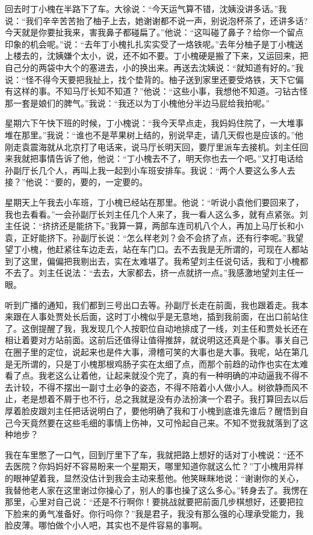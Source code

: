 \documentclass[12pt,oneside]{book}
\begin{document}
回去时丁小槐在半路下了车。大徐说：``今天运气算不错，沈姨没讲多话。''我说：``我们辛辛苦苦抬了柚子上去，她谢谢都不说一声，别说泡杯茶了，还讲多话?今天就是你要扯我来，害我鼻子都碰扁了。''他说：``这叫碰了鼻子？给你一个留点印象的机会呢。''说：``去年丁小槐扎扎实实受了一烙铁呢。''去年分柚子是丁小槐送上楼去的，沈姨嫌个太小，说，还不如不要。丁小槐硬是搬了下来，又运回来，把自己分的两袋中大个的塞进去，小的换出来。再送去沈姨说：``就知道有好的。''我说：``怪不得今天要把我扯上，找个垫背的。柚子送到家里还要受烙铁，天下它偏有这样的事。不知马厅长知不知道？''他说：``这些小事，我想他不知道。刁钻古怪那一套是娘们的脾气。''我说：``我还以为丁小槐他分半边马屁给我拍呢。''

星期六下午快下班的时候，丁小槐说：``我今天早点走，我妈妈住院了，一大堆事堆在那里。''我说：``谁也不是苹果树上结的，别说早走，请几天假也是应该的。''他刚走袁震海就从北京打了电话来，说马厅长明天回，要厅里派车去接机。刘主任回来我就把事情告诉了他，他说：``丁小槐去不了，明天你也去一个吧。''又打电话给孙副厅长几个人，再叫上我一起到小车班安排车。我说：``两个人要这么多人去接？''他说：``要的，要的，一定要的。

星期天上午我去小车班，丁小槐已经站在那里。他说：``听说小袁他们要回来了，我也去看看。''一会孙副厅长刘主任几个人来了，我一看人这么多，就有点紧张。刘主任说：``挤挤还是能挤下。''我算一算，两部车连司机八个人，再加上马厅长和小袁，正好能挤下。孙副厅长说：``怎么样老刘？会不会挤了点，还有行李呢。''我望望丁小槐，他赶紧往车边走去，站在车门口。去不去我是无所谓的，可现在人都站到了这里，偏偏把我剔出去，实在太难堪了。我希望刘主任说句话，我和丁小槐都不去了。刘主任说法：``去去，大家都去，挤一点就挤一点。''我感激地望刘主任一眼。

听到广播的通知，我们都到三号出口去等。孙副厅长走在前面，我也跟着走。我本来跟在人事处贾处长后面，这时丁小槐似乎是无意地，插到我前面，在出口前站住了。这倒提醒了我，我发现几个人按职位自动地排成了一线，刘主任和贾处长还在相让着要对方站前面。这前后还值得让值得推辞，就说明这还真是个事。事关自己在圈子里的定位，说起来也是件大事，滑稽可笑的大事也是大事。我呢，站在第几是无所谓的，只是丁小槐那根鸡肠子实在太细了点，而那个前趋的动作也实在太难看了点。我老这么让着他，让起来就没个完了，真的有一种明确的冲动逼我不得不去计较，不得不摆出一副寸土必争的姿态，不得不陪着小人做小人。树欲静而风不止，老是想着不屑于也不行，总之我就是没有办法扮演一个君子。我打算回去以后厚着脸皮跟刘主任把话说明白了，要他明确了我和丁小槐到底谁先谁后？醒悟到自己今天竟然要在这些毛细的事情上伤神，又可怜起自己来。不知不觉我就落到了这种地步？

我在车里憋了一口气，回到厅里下了车，我就把路上想好的话对丁小槐说：``还不去医院？你妈妈好不容易盼来一个星期天，哪里知道你就这么忙？''丁小槐用异样的眼神望着我，显然没估计到我会主动来惹他。他笑眯眯地说：``谢谢你的关心，我替他老人家在这里谢过你操心了，别人的事也操了这么多心。''转身去了。我愣在那里，心里对自己说：``还是不行啊你！要挑战就要把前面几步棋想好，还要把拉下脸来的勇气准备好。你行吗你？''我是君子，我没有那么强的心理承受能力，我脸皮薄。哪怕做个小人吧，其实也不是件容易的事啊。
\end{document}
